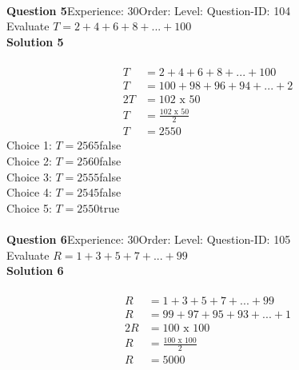 \documentclass{article}
\begin{document}
\\[4pt]
\noindent\textbf{Question 5}\hspace{20pt}Experience: 30\hspace{20pt}Order: \hspace{20pt}Level: \hspace{20pt}Question-ID: 104\\[2pt]
Evaluate $T=2+4+6+8+...+100$\\[4pt]
\noindent\textbf{Solution 5}\\[2pt]
\\[-35pt]\begin{align*}
T&=2+4+6+8+...+100\\[2pt]
T&=100+98+96+94+...+2\\[2pt]
2T&=102\,\,\text{x}\,\,50\\[2pt]
T&=\displaystyle\frac{102\,\,\text{x}\,\,50}{2}\\[2pt]
T&=2550
\end{align*}
Choice 1: \hspace{20pt}$T=2565$\hspace{20pt}false\\
Choice 2: \hspace{20pt}$T=2560$\hspace{20pt}false\\
Choice 3: \hspace{20pt}$T=2555$\hspace{20pt}false\\
Choice 4: \hspace{20pt}$T=2545$\hspace{20pt}false\\
Choice 5: \hspace{20pt}$T=2550$\hspace{20pt}true\\
\\[4pt]
\noindent\textbf{Question 6}\hspace{20pt}Experience: 30\hspace{20pt}Order: \hspace{20pt}Level: \hspace{20pt}Question-ID: 105\\[2pt]
Evaluate $R=1+3+5+7+...+99$\\[4pt]
\noindent\textbf{Solution 6}\\[2pt]
\\[-35pt]\begin{align*}
R&=1+3+5+7+...+99\\[2pt]
R&=99+97+95+93+...+1\\[2pt]
2R&=100\,\,\text{x}\,\,100\\[2pt]
R&=\displaystyle\frac{100\,\,\text{x}\,\,100}{2}\\[2pt]
R&=5000
\end{align*}
\end{document}
